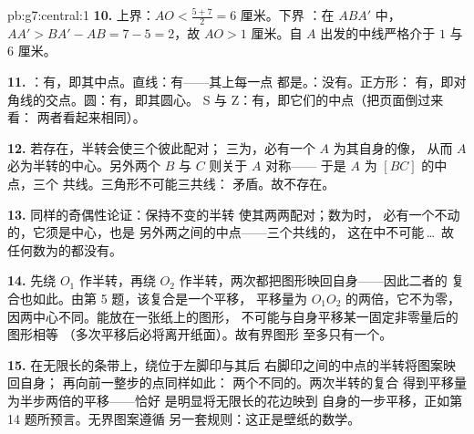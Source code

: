 \begin{solution}{pb:g7:central:1}
\textbf{10.} 上界：$AO < \frac{5 + 7}{2} = 6$ 厘米。下界
：在 $ABA'$ 中，$AA' > BA' - AB = 7 - 5 = 2$，故
$AO > 1$ 厘米。自 $A$ 出发的中线严格介于 $1$ 与
$6$ 厘米。

\textbf{11.} ：有，即其中点。直线：有——其上每一点
都是。：没有。正方形：
有，即对角线的交点。圆：有，即其圆心。
S 与 Z：有，即它们的中点（把页面倒过来看：
两者看起来相同）。

\textbf{12.} 若存在，半转会使三个彼此配对；
三为，必有一个 $A$ 为其自身的像，
从而 $A$ 必为半转的中心。另外两个 $B$ 与 $C$
则关于 $A$ 对称——
于是 $A$ 为 $[BC]$ 的中点，三个
共线。三角形不可能三共线：
矛盾。故不存在。

\textbf{13.} 同样的奇偶性论证：保持不变的半转
使其两两配对；数为时，
必有一个不动的，它须是中心，也是
另外两之间的中点——三个共线的，
这在中不可能\,\dots\ 故
任何数为的都没有。

\textbf{14.} 先绕 $O_1$ 作半转，再绕
$O_2$ 作半转，两次都把图形映回自身——因此二者的
复合也如此。由第 5 题，该复合是一个平移，
平移量为 $O_1 O_2$ 的两倍，它不为零，
因两中心不同。能放在一张纸上的图形，
不可能与自身平移某一固定非零量后的图形相等
（多次平移后必将离开纸面）。故有界图形
至多只有一个。

\textbf{15.} 在无限长的条带上，绕位于左脚印与其后
右脚印之间的中点的半转将图案映回自身；
再向前一整步的点同样如此：
两个不同的。两次半转的复合
得到平移量为半步两倍的平移——恰好
是明显将无限长的花边映到
自身的一步平移，正如第 14 题所预言。无界图案遵循
另一套规则：这正是壁纸的数学。
\end{solution}
